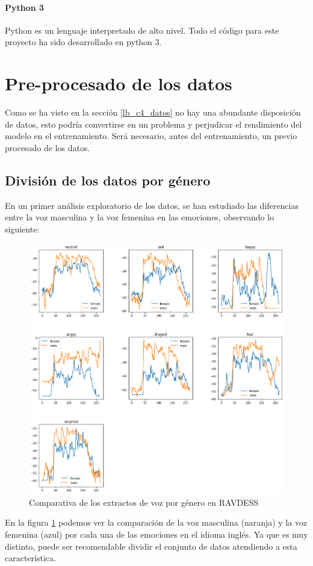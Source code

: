\documentclass[11pt,a4paper,spanish]{book}
\begin{document}
	\paragraph{Python 3} Python es un lenguaje interpretado de alto nivel. Todo el código para este proyecto ha sido desarrollado en python 3.
	
	\section{Pre-procesado de los datos}
	Como se ha visto en la sección \ref{lb_c4_datos} no hay una abundante disposición de datos, esto podría convertirse en un problema y perjudicar el rendimiento del modelo en el entrenamiento. 
	Será necesario, antes del entrenamiento, un previo procesado de los datos.
	
	\subsection{División de los datos por género}
	\label{cap4:division}
	En un primer análisis exploratorio de los datos, se han estudiado las diferencias entre la voz masculina y la voz femenina en las emociones, observando lo siguiente:
	
	\begin{figure}[H]
		\centering
		\includegraphics[scale=0.35]{comparative_waveform.png} 
		\caption{Comparativa de los extractos de voz por género en RAVDESS}
		\label{fig:comp_emociones_genero}
	\end{figure}
	En la figura \ref{fig:comp_emociones_genero} podemos ver la comparación de la voz masculina (naranja) y la voz femenina (azul) por cada una de las emociones en el idioma inglés. Ya que es muy distinto, puede ser recomendable dividir el conjunto de datos atendiendo a esta característica.
	
\end{document}
